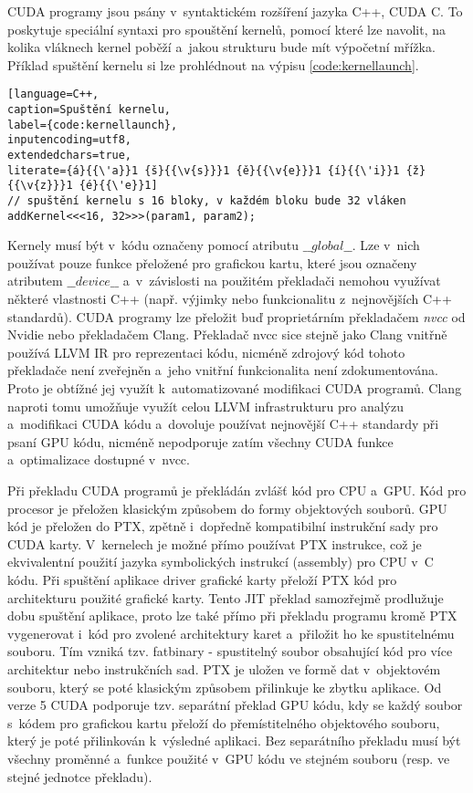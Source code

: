 CUDA programy jsou psány v~syntaktickém rozšíření jazyka C++, CUDA C. To poskytuje speciální syntaxi pro spouštění kernelů, pomocí které lze navolit, na kolika vláknech kernel poběží a~jakou strukturu bude mít výpočetní mřížka. Příklad spuštění kernelu si lze prohlédnout na výpisu \ref{code:kernellaunch}.

\begin{lstlisting}[language=C++,
caption=Spuštění kernelu,
label={code:kernellaunch},
inputencoding=utf8,
extendedchars=true,
literate={á}{{\'a}}1 {š}{{\v{s}}}1 {ě}{{\v{e}}}1 {í}{{\'i}}1 {ž}{{\v{z}}}1 {é}{{\'e}}1]
// spuštění kernelu s 16 bloky, v každém bloku bude 32 vláken
addKernel<<<16, 32>>>(param1, param2);
\end{lstlisting}

Kernely musí být v~kódu označeny pomocí atributu $\_\_global\_\_$. Lze v~nich používat pouze funkce přeložené pro grafickou kartu, které jsou označeny atributem $\_\_device\_\_$ a~v~závislosti na použitém překladači nemohou využívat některé vlastnosti C++ (např. výjimky nebo funkcionalitu z~nejnovějších C++ standardů). CUDA programy lze přeložit buď proprietárním překladačem \emph{nvcc} od Nvidie nebo překladačem Clang. Překladač nvcc sice stejně jako Clang vnitřně používá LLVM IR pro reprezentaci kódu, nicméně zdrojový kód tohoto překladače není zveřejněn a~jeho vnitřní funkcionalita není zdokumentována. Proto je obtížné jej využít k~automatizované modifikaci CUDA programů. Clang naproti tomu umožňuje využít celou LLVM infrastrukturu pro analýzu a~modifikaci CUDA kódu a~dovoluje používat nejnovější C++ standardy při psaní GPU kódu, nicméně nepodporuje zatím všechny CUDA funkce a~optimalizace dostupné v~nvcc.

Při překladu CUDA programů je překládán zvlášť kód pro CPU a~GPU. Kód pro procesor je přeložen klasickým způsobem do formy objektových souborů. GPU kód je přeložen do PTX, zpětně i~dopředně kompatibilní instrukční sady pro CUDA karty. V~kernelech je možné přímo používat PTX instrukce, což je ekvivalentní použití jazyka symbolických instrukcí (assembly) pro CPU v~C kódu. Při spuštění aplikace driver grafické karty přeloží PTX kód pro architekturu použité grafické karty. Tento JIT překlad samozřejmě prodlužuje dobu spuštění aplikace, proto lze také přímo při překladu programu kromě PTX vygenerovat i~kód pro zvolené architektury karet a~přiložit ho ke spustitelnému souboru. Tím vzniká tzv. fatbinary - spustitelný soubor obsahující kód pro více architektur nebo instrukčních sad. PTX je uložen ve formě dat v~objektovém souboru, který se poté klasickým způsobem přilinkuje ke zbytku aplikace. Od verze 5 CUDA podporuje tzv. separátní překlad GPU kódu, kdy se každý soubor s~kódem pro grafickou kartu přeloží do přemístitelného objektového souboru, který je poté přilinkován k~výsledné aplikaci. Bez separátního překladu musí být všechny proměnné a~funkce použité v~GPU kódu ve stejném souboru (resp. ve stejné jednotce překladu).

